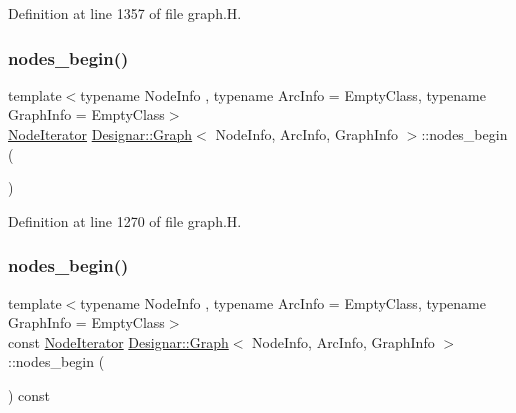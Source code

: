 Definition at line 1357 of file graph.\+H.

\mbox{\label{class_designar_1_1_graph_a4f492f9b89d1d647e53171d7bb4d4acd}} 
\subsubsection{\texorpdfstring{nodes\+\_\+begin()}{nodes\_begin()}\hspace{0.1cm}{\footnotesize\ttfamily [1/2]}}
{\footnotesize\ttfamily template$<$typename Node\+Info , typename Arc\+Info  = Empty\+Class, typename Graph\+Info  = Empty\+Class$>$ \\
\hyperlink{class_designar_1_1_graph_1_1_node_iterator}{Node\+Iterator} \hyperlink{class_designar_1_1_graph}{Designar\+::\+Graph}$<$ Node\+Info, Arc\+Info, Graph\+Info $>$\+::nodes\+\_\+begin (\begin{DoxyParamCaption}{ }\end{DoxyParamCaption})\hspace{0.3cm}{\ttfamily [inline]}}



Definition at line 1270 of file graph.\+H.

\mbox{\label{class_designar_1_1_graph_acd4d942eba98e1eb138b9566f1d9bb75}} 
\subsubsection{\texorpdfstring{nodes\+\_\+begin()}{nodes\_begin()}\hspace{0.1cm}{\footnotesize\ttfamily [2/2]}}
{\footnotesize\ttfamily template$<$typename Node\+Info , typename Arc\+Info  = Empty\+Class, typename Graph\+Info  = Empty\+Class$>$ \\
const \hyperlink{class_designar_1_1_graph_1_1_node_iterator}{Node\+Iterator} \hyperlink{class_designar_1_1_graph}{Designar\+::\+Graph}$<$ Node\+Info, Arc\+Info, Graph\+Info $>$\+::nodes\+\_\+begin (\begin{DoxyParamCaption}{ }\end{DoxyParamCaption}) const\hspace{0.3cm}{\ttfamily [inline]}}



